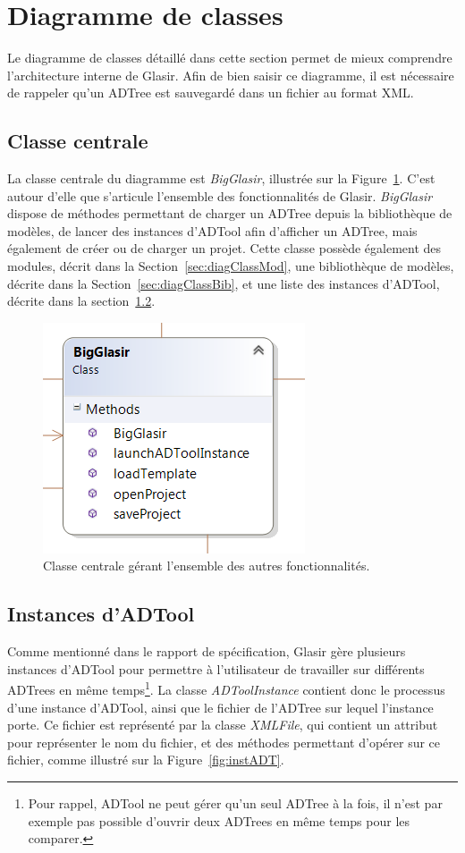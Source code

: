 \section{Diagramme de classes}
    \label{sec:diagClass}
    
    Le diagramme de classes détaillé dans cette section permet de mieux comprendre l'architecture interne de Glasir. Afin de bien saisir ce diagramme, il est nécessaire de rappeler qu'un ADTree est sauvegardé dans un fichier au format XML.
    
    \subsection{Classe centrale}
    	\label{sec:diagClassCentral}
    	La classe centrale du diagramme est \emph{BigGlasir}, illustrée sur la {\sc Figure}~\ref{fig:bigglasir}. C'est autour d'elle que s'articule l'ensemble des fonctionnalités de Glasir. \emph{BigGlasir} dispose de méthodes permettant de charger un ADTree depuis la bibliothèque de modèles, de lancer des instances d'ADTool afin d'afficher un ADTree, mais également de créer ou de charger un projet. Cette classe possède également des modules, décrit dans la {\sc Section}~{\ref{sec:diagClassMod}}, une bibliothèque de modèles, décrite dans la {\sc Section}~{\ref{sec:diagClassBib}}, et une liste des instances d'ADTool, décrite dans la {\sc section}~{\ref{sec:diagClassADT}}.
    	
    	\begin{figure}[H]
	        \centering
	        \includegraphics[height=0.3\textwidth]{figure/bigglasir.png}
	        \caption{Classe centrale gérant l'ensemble des autres fonctionnalités.}
	        \label{fig:bigglasir}
	    \end{figure}
    	
    \subsection{Instances d'ADTool}
    	\label{sec:diagClassADT}
    	
    	Comme mentionné dans le rapport de spécification, Glasir gère plusieurs instances d'ADTool pour permettre à l'utilisateur de travailler sur différents ADTrees en même temps\footnote{Pour rappel, ADTool ne peut gérer qu'un seul ADTree à la fois, il n'est par exemple pas possible d'ouvrir deux ADTrees en même temps pour les comparer.}. La classe \emph{ADToolInstance} contient donc le processus d'une instance d'ADTool, ainsi que le fichier de l'ADTree sur lequel l'instance porte. Ce fichier est représenté par la classe \emph{XMLFile}, qui contient un attribut pour représenter le nom du fichier, et des méthodes permettant d'opérer sur ce fichier, comme illustré sur la {\sc Figure}~\ref{fig:instADT}.
    	

